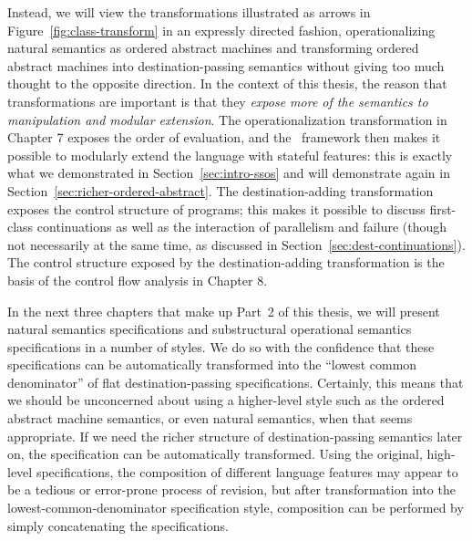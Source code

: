 Instead, we will view the transformations illustrated as arrows in
Figure~\ref{fig:class-transform} in an expressly directed fashion,
operationalizing natural semantics as ordered abstract machines and
transforming ordered abstract machines into destination-passing
semantics without giving too much thought to the opposite
direction. In the context of this thesis, the reason that
transformations are important is that they {\it expose more of the
  semantics to manipulation and modular extension}.  The
operationalization transformation in Chapter 7 exposes the order of
evaluation, and the \sls~framework then makes it possible to modularly
extend the language with stateful features: this is exactly what we
demonstrated in Section~\ref{sec:intro-ssos} and will
demonstrate again in Section~\ref{sec:richer-ordered-abstract}.  The
destination-adding transformation exposes the control structure of
programs; this makes it possible to discuss first-class continuations
as well as the interaction of parallelism and failure (though not
necessarily at the same time, as discussed in
Section~\ref{sec:dest-continuations}).  The control structure exposed
by the destination-adding transformation is the basis of the control
flow analysis in Chapter 8.

In the next three chapters that make up Part~2 of this thesis, we will
present natural semantics specifications and substructural operational
semantics specifications in a number of styles. We do so with the
confidence that these specifications can be automatically transformed
into the ``lowest common denominator'' of flat destination-passing
specifications.  Certainly, this means that we should be unconcerned
about using a higher-level style such as the ordered abstract machine
semantics, or even natural semantics, when that seems appropriate. If
we need the richer structure of destination-passing semantics later
on, the specification can be automatically transformed.  Using the
original, high-level specifications, the composition of different
language features may appear to be a tedious or error-prone process of
revision, but after transformation into the lowest-common-denominator
specification style, composition can be performed by simply
concatenating the specifications.

